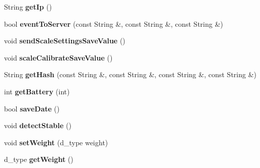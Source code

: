 \begin{DoxyCompactItemize}
\item 
\hypertarget{class_scales_class_aad0e4d90bf70c3b9f124b79e1b662630}{String {\bfseries get\-Ip} ()}\label{class_scales_class_aad0e4d90bf70c3b9f124b79e1b662630}

\item 
\hypertarget{class_scales_class_a2e8290f412f59a7e3526c9bc4950d4af}{bool {\bfseries event\-To\-Server} (const String \&, const String \&, const String \&)}\label{class_scales_class_a2e8290f412f59a7e3526c9bc4950d4af}

\item 
\hypertarget{class_scales_class_abed12fe0ad4a770a5ae1667a71ca6f0e}{void {\bfseries send\-Scale\-Settings\-Save\-Value} ()}\label{class_scales_class_abed12fe0ad4a770a5ae1667a71ca6f0e}

\item 
\hypertarget{class_scales_class_adabc8ef5588157ed006687668650e6e6}{void {\bfseries scale\-Calibrate\-Save\-Value} ()}\label{class_scales_class_adabc8ef5588157ed006687668650e6e6}

\item 
\hypertarget{class_scales_class_a36e605413236676b4aaaeb0ad147ccb5}{String {\bfseries get\-Hash} (const String \&, const String \&, const String \&, const String \&)}\label{class_scales_class_a36e605413236676b4aaaeb0ad147ccb5}

\item 
\hypertarget{class_scales_class_a1b2c063047e9a381475ca44f403c151f}{int {\bfseries get\-Battery} (int)}\label{class_scales_class_a1b2c063047e9a381475ca44f403c151f}

\item 
\hypertarget{class_scales_class_a5f52b996b04d7d8b558670598b640875}{bool {\bfseries save\-Date} ()}\label{class_scales_class_a5f52b996b04d7d8b558670598b640875}

\item 
\hypertarget{class_scales_class_adfe2e14d11c46802925566120d63d340}{void {\bfseries detect\-Stable} ()}\label{class_scales_class_adfe2e14d11c46802925566120d63d340}

\item 
\hypertarget{class_scales_class_abb49659c2d7f519bc5f5abf3fbeac7e9}{void {\bfseries set\-Weight} (d\-\_\-type weight)}\label{class_scales_class_abb49659c2d7f519bc5f5abf3fbeac7e9}

\item 
\hypertarget{class_scales_class_a3b58718213d905949104529db727f881}{d\-\_\-type {\bfseries get\-Weight} ()}\label{class_scales_class_a3b58718213d905949104529db727f881}


\end{DoxyCompactItemize}
